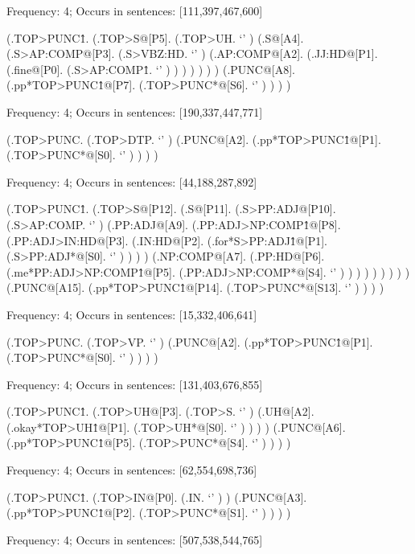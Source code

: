 \documentclass[10pt]{article}
\begin{document}
Frequency: 4; Occurs in sentences: [111,397,467,600]


\begin{parsetree} (.TOP>PUNC\^1. (.TOP>S@[P5]. (.TOP>UH. `' ) (.S@[A4]. (.S>AP:COMP@[P3]. (.S>VBZ:HD. `' ) (.AP:COMP@[A2]. (.JJ:HD@[P1]. (.fine@[P0]. (.S>AP:COMP\^1. `' ) ) ) ) ) ) ) (.PUNC@[A8]. (.pp*TOP>PUNC\^1@[P7]. (.TOP>PUNC*@[S6]. `' ) ) ) ) \end{parsetree}

Frequency: 4; Occurs in sentences: [190,337,447,771]


\begin{parsetree} (.TOP>PUNC. (.TOP>DTP. `' ) (.PUNC@[A2]. (.pp*TOP>PUNC\^1@[P1]. (.TOP>PUNC*@[S0]. `' ) ) ) ) \end{parsetree}

Frequency: 4; Occurs in sentences: [44,188,287,892]


\begin{parsetree} (.TOP>PUNC\^1. (.TOP>S@[P12]. (.S@[P11]. (.S>PP:ADJ@[P10]. (.S>AP:COMP. `' ) (.PP:ADJ@[A9]. (.PP:ADJ>NP:COMP\^1@[P8]. (.PP:ADJ>IN:HD@[P3]. (.IN:HD@[P2]. (.for*S>PP:ADJ\^1@[P1]. (.S>PP:ADJ*@[S0]. `' ) ) ) ) (.NP:COMP@[A7]. (.PP:HD@[P6]. (.me*PP:ADJ>NP:COMP\^1@[P5]. (.PP:ADJ>NP:COMP*@[S4]. `' ) ) ) ) ) ) ) ) ) (.PUNC@[A15]. (.pp*TOP>PUNC\^1@[P14]. (.TOP>PUNC*@[S13]. `' ) ) ) ) \end{parsetree}

Frequency: 4; Occurs in sentences: [15,332,406,641]


\begin{parsetree} (.TOP>PUNC. (.TOP>VP. `' ) (.PUNC@[A2]. (.pp*TOP>PUNC\^1@[P1]. (.TOP>PUNC*@[S0]. `' ) ) ) ) \end{parsetree}

Frequency: 4; Occurs in sentences: [131,403,676,855]


\begin{parsetree} (.TOP>PUNC\^1. (.TOP>UH@[P3]. (.TOP>S. `' ) (.UH@[A2]. (.okay*TOP>UH\^1@[P1]. (.TOP>UH*@[S0]. `' ) ) ) ) (.PUNC@[A6]. (.pp*TOP>PUNC\^1@[P5]. (.TOP>PUNC*@[S4]. `' ) ) ) ) \end{parsetree}

Frequency: 4; Occurs in sentences: [62,554,698,736]


\begin{parsetree} (.TOP>PUNC\^1. (.TOP>IN@[P0]. (.IN. `' ) ) (.PUNC@[A3]. (.pp*TOP>PUNC\^1@[P2]. (.TOP>PUNC*@[S1]. `' ) ) ) ) \end{parsetree}

Frequency: 4; Occurs in sentences: [507,538,544,765]
\end{document}
